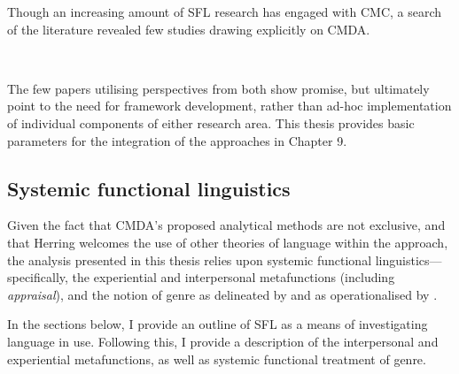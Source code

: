 			Though an increasing amount of SFL research has engaged with CMC, a search of the literature revealed few studies drawing explicitly on CMDA. 

			~\\

			The few papers utilising perspectives from both show promise, but ultimately point to the need for framework development, rather than ad-hoc implementation of individual components of either research area. This thesis provides basic parameters for the integration of the approaches in Chapter 9.

	\subsection{Systemic functional linguistics}




	  Given the fact that CMDA's proposed analytical methods are not exclusive, and that Herring welcomes the use of other theories of language within the approach, the analysis presented in this thesis relies upon systemic functional linguistics---specifically, the experiential and interpersonal metafunctions (including \emph{appraisal}), and the notion of genre as delineated by \textcite{hovy_types_1996,martin_analysing_1997,martin_genre_2006} and as operationalised by \textcite{eggins_analysing_2004}. 

	  In the sections below, I provide an outline of SFL as a means of investigating language in use. Following this, I provide a description of the interpersonal and experiential metafunctions, as well as systemic functional treatment of genre.

